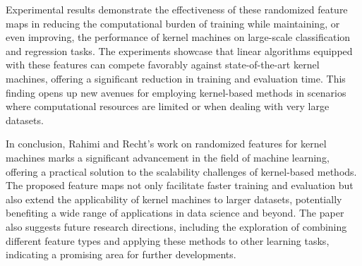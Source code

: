 \documentclass{article}
\begin{document}
Experimental results demonstrate the effectiveness of these randomized feature maps in reducing the computational burden of training while maintaining, or even improving, the performance of kernel machines on large-scale classification and regression tasks. The experiments showcase that linear algorithms equipped with these features can compete favorably against state-of-the-art kernel machines, offering a significant reduction in training and evaluation time. This finding opens up new avenues for employing kernel-based methods in scenarios where computational resources are limited or when dealing with very large datasets.

In conclusion, Rahimi and Recht's work on randomized features for kernel machines marks a significant advancement in the field of machine learning, offering a practical solution to the scalability challenges of kernel-based methods. The proposed feature maps not only facilitate faster training and evaluation but also extend the applicability of kernel machines to larger datasets, potentially benefiting a wide range of applications in data science and beyond. The paper also suggests future research directions, including the exploration of combining different feature types and applying these methods to other learning tasks, indicating a promising area for further developments.
\end{document}
